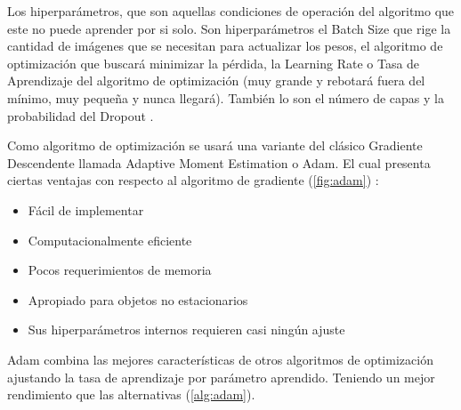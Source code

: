 Los hiperparámetros, que son aquellas condiciones de operación del algoritmo que
este no puede aprender por si solo. Son hiperparámetros el Batch Size que rige
la cantidad de imágenes que se necesitan para actualizar los pesos, el algoritmo
de optimización que buscará minimizar la pérdida, la Learning Rate o Tasa de
Aprendizaje del algoritmo de optimización (muy grande y rebotará fuera del
mínimo, muy pequeña y nunca llegará). También lo son el número de capas y la
probabilidad del Dropout \cite{Goodfellow2016}.

Como algoritmo de optimización se usará una variante del clásico Gradiente
Descendente llamada Adaptive Moment Estimation o Adam. El cual presenta ciertas
ventajas con respecto al algoritmo de gradiente (\autoref{fig:adam})
\cite{Kingma2014}:

\begin{itemize}
    \item Fácil de implementar
    \item Computacionalmente eficiente
    \item Pocos requerimientos de memoria
    \item Apropiado para objetos no estacionarios
    \item Sus hiperparámetros internos requieren casi ningún ajuste
\end{itemize}

Adam combina las mejores características de otros algoritmos de optimización
ajustando la tasa de aprendizaje por parámetro aprendido. Teniendo un mejor
rendimiento que las alternativas (\autoref{alg:adam}).

